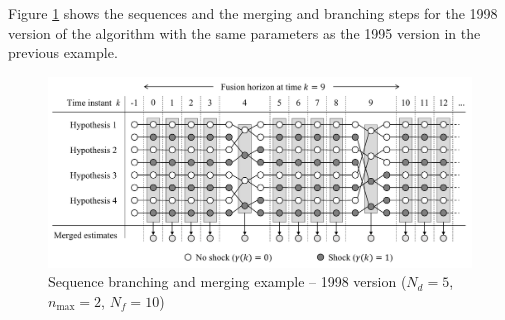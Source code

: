 Figure \ref{fig:mm-obs-seq-sf98} shows the sequences and the merging and branching steps for the 1998 version of the algorithm with the same parameters as the 1995 version in the previous example.
\begin{figure}[htp]
	\centering
	\includegraphics[width=15cm]{images/mm_obs_seq_sf98.pdf}
	\caption{Sequence branching and merging example – 1998 version ($N_d=5$, $n_\text{max}=2$, $N_f=10$)}
	\label{fig:mm-obs-seq-sf98}
\end{figure}
